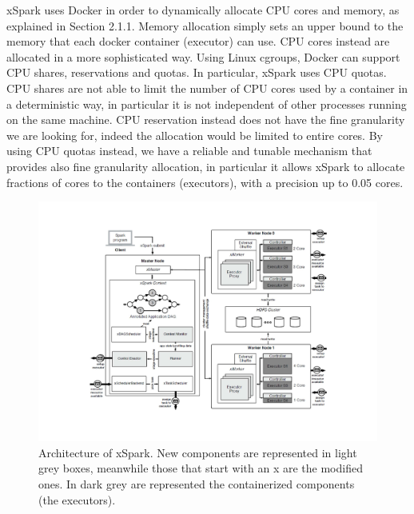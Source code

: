 xSpark uses Docker in order to dynamically allocate CPU cores and
memory, as explained in Section 2.1.1. Memory allocation simply sets
an upper bound to the memory that each docker container (executor)
can use. CPU cores instead are allocated in a more sophisticated way.
Using Linux cgroups, Docker can support CPU shares, reservations
and quotas. In particular, xSpark uses CPU quotas. CPU shares are
not able to limit the number of CPU cores used by a container in a deterministic
way, in particular it is not independent of other processes
running on the same machine. CPU reservation instead does not have
the fine granularity we are looking for, indeed the allocation would
be limited to entire cores. By using CPU quotas instead, we have a
reliable and tunable mechanism that provides also fine granularity
allocation, in particular it allows xSpark to allocate fractions of cores
to the containers (executors), with a precision up to 0.05 cores.
\begin{figure}
	\centering
	\includegraphics[width=\columnwidth]{Images/xspark_architecture.pdf}  
	\caption[Architecture of xSpark.]{Architecture of xSpark. New components are represented in light grey boxes, meanwhile those that start with an x are the modified ones. In dark grey are represented the containerized components (the executors).}
	\label{fig:xSparkArchitecture}
\end{figure}
